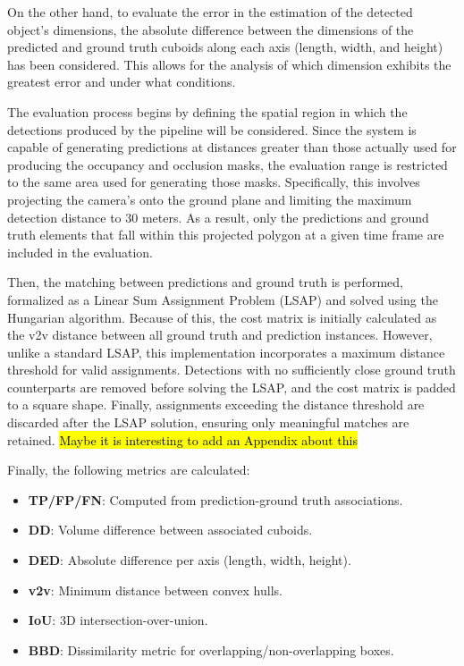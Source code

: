 On the other hand, to evaluate the error in the estimation of the detected object's dimensions, the absolute difference between the dimensions of the predicted and ground truth cuboids along each axis (length, width, and height) has been considered. This allows for the analysis of which dimension exhibits the greatest error and under what conditions.

The evaluation process begins by defining the spatial region in which the detections produced by the pipeline will be considered. Since the system is capable of generating predictions at distances greater than those actually used for producing the  occupancy and occlusion masks, the evaluation range is restricted to the same area used for generating those masks. Specifically, this involves projecting the camera's  onto the ground plane and limiting the maximum detection distance to $30$ meters. As a result, only the predictions and ground truth elements that fall within this projected polygon at a given time frame are included in the evaluation.

Then, the matching between predictions and ground truth is performed, formalized as a Linear Sum Assignment Problem (LSAP) and solved using the Hungarian algorithm. Because of this, the cost matrix is initially calculated as the v2v distance between all ground truth and prediction instances.  However, unlike a standard LSAP, this implementation incorporates a maximum distance threshold for valid assignments. Detections with no sufficiently close ground truth counterparts are removed before solving the LSAP, and the cost matrix is padded to a square shape. Finally, assignments exceeding the distance threshold are discarded after the LSAP solution, ensuring only meaningful matches are retained. 
\hl{Maybe it is interesting to add an Appendix about this}

Finally, the following metrics are calculated:
\begin{itemize}
    \item \textbf{TP/FP/FN}: Computed from prediction-ground truth associations.
    \item \textbf{DD}: Volume difference between associated cuboids. %
    \item \textbf{DED}: Absolute difference per axis (length, width, height). %
    \item \textbf{v2v}: Minimum distance between convex hulls. %
    \item \textbf{IoU}: 3D intersection-over-union. %
    \item \textbf{BBD}: Dissimilarity metric for overlapping/non-overlapping boxes. %
\end{itemize}


